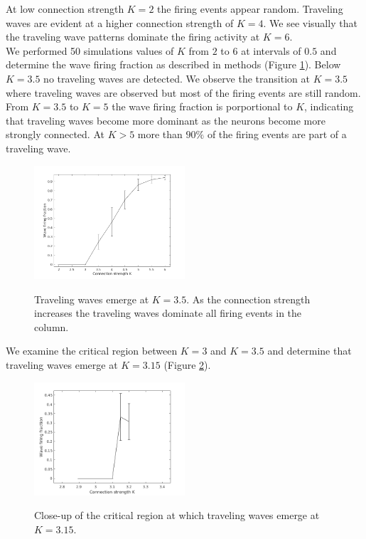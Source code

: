 \documentclass[a4paper,11pt]{article}
\begin{document}
At low connection strength $K=2$ the firing events appear random.
Traveling waves are evident at a higher connection strength of $K=4$.
We see visually that the traveling wave patterns dominate the firing activity at $K=6$. \\
We performed 50 simulations values of $K$ from $2$ to $6$ at intervals of $0.5$ and determine the wave firing fraction as described in methods (Figure \ref{fig:conn_fraction}).
Below $K=3.5$ no traveling waves are detected.
We observe the transition at $K=3.5$ where traveling waves are observed but most of the firing events are still random.
From $K=3.5$ to $K=5$ the wave firing fraction is porportional to $K$, indicating that traveling waves become more dominant as the neurons become more strongly connected.
At $K>5$ more than $90\%$ of the firing events are part of a traveling wave.
\begin{figure}[!htb]
 \caption{Traveling waves emerge at $K=3.5$. As the connection strength increases the traveling waves dominate all firing events in the column.}
 \centering
   \includegraphics[width=0.5\textwidth]{fig/ConnectionStrengthWaveFraction}  
 \label{fig:conn_fraction}
\end{figure}
We examine the critical region between $K=3$ and $K=3.5$ and determine that traveling waves emerge at $K=3.15$ (Figure \ref{fig:conn_fraction_critical}).
\begin{figure}[!htb]
 \caption{Close-up of the critical region at which traveling waves emerge at $K=3.15$.}
 \centering
   \includegraphics[width=0.5\textwidth]{fig/ConnectionStrengthWaveFraction_CriticalRegion}  
 \label{fig:conn_fraction_critical}
\end{figure}
\end{document}

